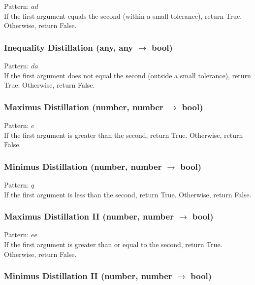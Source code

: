 \documentclass[12pt]{article}
\begin{document}
    Pattern: $ad$\\
      If the first argument equals the second (within a small tolerance), return True. Otherwise, return False.\\


  \label{sec: patterns/logic@hexcasting:not_equals}
\subsubsection*{Inequality Distillation (any, any $\rightarrow$ bool)}

    Pattern: $da$\\
      If the first argument does not equal the second (outside a small tolerance), return True. Otherwise, return False.\\


  \label{sec: patterns/logic@hexcasting:greater}
\subsubsection*{Maximus Distillation (number, number $\rightarrow$ bool)}

    Pattern: $e$\\
      If the first argument is greater than the second, return True. Otherwise, return False.\\


  \label{sec: patterns/logic@hexcasting:less}
\subsubsection*{Minimus Distillation (number, number $\rightarrow$ bool)}

    Pattern: $q$\\
      If the first argument is less than the second, return True. Otherwise, return False.\\


  \label{sec: patterns/logic@hexcasting:greater_eq}
\subsubsection*{Maximus Distillation II (number, number $\rightarrow$ bool)}

    Pattern: $ee$\\
      If the first argument is greater than or equal to the second, return True. Otherwise, return False.\\


  \label{sec: patterns/logic@hexcasting:less_eq}
\subsubsection*{Minimus Distillation II (number, number $\rightarrow$ bool)}
\end{document}
